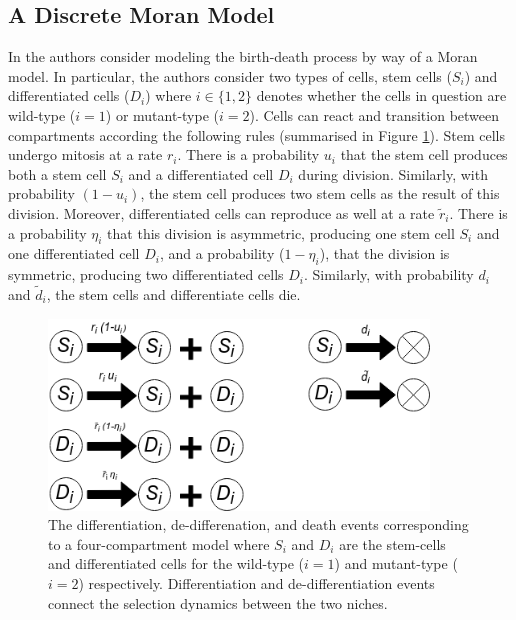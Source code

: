 \documentclass[12pt]{article}
\begin{document}
\subsection{A Discrete Moran Model}
In \cite{mohammad} the authors consider modeling the birth-death process by way of a Moran model. In particular, the authors consider two types of cells, stem cells ($S_i$) and differentiated cells ($D_i$) where $i\in\{1,2\}$ denotes whether the cells in question are wild-type ($i=1$) or mutant-type ($i=2$). Cells can react and transition between compartments according the following rules (summarised in Figure \ref{MohFig1}). Stem cells undergo mitosis at a rate $r_i$. There is a probability $u_i$ that the stem cell produces both a stem cell $S_i$ and a differentiated cell $D_i$ during division. Similarly, with probability $(1-u_i)$, the stem cell produces two stem cells as the result of this division. Moreover, differentiated cells can reproduce as well at a rate $\tilde{r}_i$. There is a probability $\eta_i$ that this division is asymmetric, producing one stem cell $S_i$ and one differentiated cell $D_i$, and a probability ($1-\eta_i$), that the division is symmetric, producing two differentiated cells $D_i$. Similarly, with probability $d_i$ and $\tilde{d}_i$, the stem cells and differentiate cells die.

\begin{figure}[H]
\begin{center}
\includegraphics[width=0.9\textwidth]{moh_rxn.png}
\end{center}
\caption{The differentiation, de-differenation, and death events corresponding to a four-compartment model where $S_i$ and $D_i$ are the stem-cells and differentiated cells for the wild-type ($i=1$) and mutant-type ($i=2$) respectively. Differentiation and de-differentiation events connect the selection dynamics between the two niches.}\label{MohFig1}
\end{figure}
\end{document}
